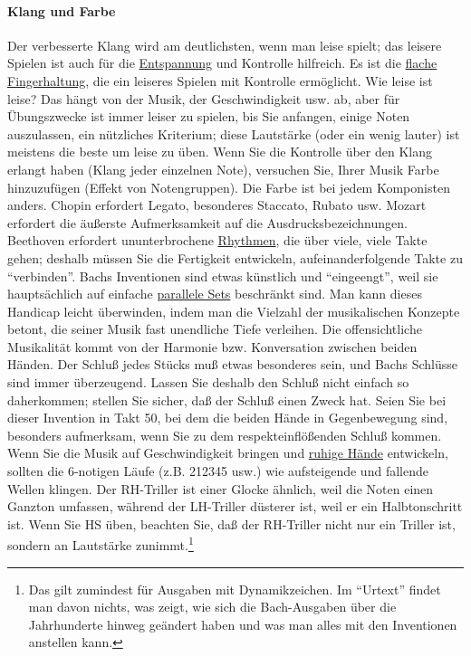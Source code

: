 \paragraph{Klang und Farbe}

Der verbesserte Klang wird am deutlichsten, wenn man leise spielt; das leisere Spielen ist auch für die \hyperref[c1ii14]{Entspannung} und Kontrolle hilfreich.
Es ist die \hyperref[c1iii4b]{flache Fingerhaltung}, die ein leiseres Spielen mit Kontrolle ermöglicht.
Wie leise ist leise?
Das hängt von der Musik, der Geschwindigkeit usw. ab, aber für Übungszwecke ist immer leiser zu spielen, bis Sie anfangen, einige Noten auszulassen, ein nützliches Kriterium; diese Lautstärke (oder ein wenig lauter) ist meistens die beste um leise zu üben.
Wenn Sie die Kontrolle über den Klang erlangt haben (Klang jeder einzelnen Note), versuchen Sie, Ihrer Musik Farbe hinzuzufügen (Effekt von Notengruppen).
Die Farbe ist bei jedem Komponisten anders.
Chopin erfordert Legato, besonderes Staccato, Rubato usw.
Mozart erfordert die äußerste Aufmerksamkeit auf die Ausdrucksbezeichnungen.
Beethoven erfordert ununterbrochene \hyperref[c1iii1b]{Rhythmen}, die über viele, viele Takte gehen; deshalb müssen Sie die Fertigkeit entwickeln, aufeinanderfolgende Takte zu \enquote{verbinden}.
Bachs Inventionen sind etwas künstlich und \enquote{eingeengt}, weil sie hauptsächlich auf einfache \hyperref[c1iii7b]{parallele Sets} beschränkt sind.
Man kann dieses Handicap leicht überwinden, indem man die Vielzahl der musikalischen Konzepte betont, die seiner Musik fast unendliche Tiefe verleihen.
Die offensichtliche Musikalität kommt von der Harmonie bzw. Konversation zwischen beiden Händen.
Der Schluß jedes Stücks muß etwas besonderes sein, und Bachs Schlüsse sind immer überzeugend.
Lassen Sie deshalb den Schluß nicht einfach so daherkommen; stellen Sie sicher, daß der Schluß einen Zweck hat.
Seien Sie bei dieser Invention in Takt 50, bei dem die beiden Hände in Gegenbewegung sind, besonders aufmerksam, wenn Sie zu dem respekteinflößenden Schluß kommen.
Wenn Sie die Musik auf Geschwindigkeit bringen und \hyperref[ruhig]{ruhige Hände} entwickeln, sollten die 6-notigen Läufe (z.B. 212345 usw.) wie aufsteigende und fallende Wellen klingen.
Der RH-Triller ist einer Glocke ähnlich, weil die Noten einen Ganzton umfassen, während der LH-Triller düsterer ist, weil er ein Halbtonschritt ist.
Wenn Sie HS üben, beachten Sie, daß der RH-Triller nicht nur ein Triller ist, sondern an Lautstärke zunimmt.\footnote{Das gilt zumindest für Ausgaben mit Dynamikzeichen. Im \enquote{Urtext} findet man davon nichts, was zeigt, wie sich die Bach-Ausgaben über die Jahrhunderte hinweg geändert haben und was man alles mit den Inventionen anstellen kann.}
